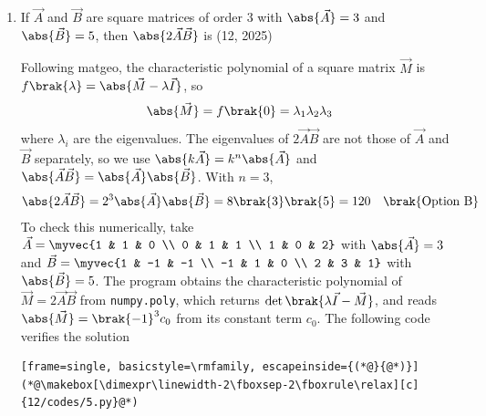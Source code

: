 \begin{enumerate}[label=\thesubsection.\arabic*, ref=\thesubsection.\theenumi]
\solution
(theory only) A matrix is symmetric if $\vec{A}^{\top} = \vec{A}$. For a diagonal matrix the transpose leaves every entry unchanged,
\begin{align}
	\vec{A}^{\top} = \myvec{3 & 0 & 0 \\ 0 & 2 & 0 \\ 0 & 0 & 5} = \vec{A}
\end{align}
The diagonal entries are not all equal, so $\vec{A}$ is not a scalar matrix; it is neither the identity nor the null matrix. Hence $\vec{A}$ is a symmetric matrix $\brak{\text{Option D}}$.

\item
If $\vec{A}$ and $\vec{B}$ are square matrices of order $3$ with $\abs{\vec{A}} = 3$ and $\abs{\vec{B}} = 5$, then $\abs{2\vec{A}\vec{B}}$ is
\hfill (12, 2025)

\solution
Following matgeo, the characteristic polynomial of a square matrix $\vec{M}$ is $f\brak{\lambda} = \abs{\vec{M} - \lambda\vec{I}}$, so
\begin{align}
	\abs{\vec{M}} = f\brak{0} = \lambda_1\lambda_2\lambda_3
\end{align}
where $\lambda_i$ are the eigenvalues. The eigenvalues of $2\vec{A}\vec{B}$ are not those of $\vec{A}$ and $\vec{B}$ separately, so we use $\abs{k\vec{A}} = k^n\abs{\vec{A}}$ and $\abs{\vec{A}\vec{B}} = \abs{\vec{A}}\abs{\vec{B}}$. With $n = 3$,
\begin{align}
	\abs{2\vec{A}\vec{B}} = 2^3\abs{\vec{A}}\abs{\vec{B}} = 8\brak{3}\brak{5} = 120 \quad \brak{\text{Option B}}
\end{align}
To check this numerically, take $\vec{A} = \myvec{1 & 1 & 0 \\ 0 & 1 & 1 \\ 1 & 0 & 2}$ with $\abs{\vec{A}} = 3$ and $\vec{B} = \myvec{1 & -1 & -1 \\ -1 & 1 & 0 \\ 2 & 3 & 1}$ with $\abs{\vec{B}} = 5$. The program obtains the characteristic polynomial of $\vec{M} = 2\vec{A}\vec{B}$ from \texttt{numpy.poly}, which returns $\det\brak{\lambda\vec{I} - \vec{M}}$, and reads $\abs{\vec{M}} = \brak{-1}^3 c_0$ from its constant term $c_0$. The following code verifies the solution
\begin{lstlisting}[frame=single, basicstyle=\rmfamily, escapeinside={(*@}{@*)}]
(*@\makebox[\dimexpr\linewidth-2\fboxsep-2\fboxrule\relax][c]{12/codes/5.py}@*)
\end{lstlisting}


\end{enumerate}

